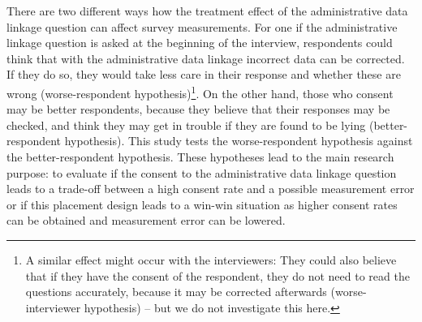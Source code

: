 There are two different ways how the treatment effect of the administrative data linkage question can affect survey measurements. For one if the administrative linkage question is asked at the beginning of the interview, respondents could think that with the administrative data linkage incorrect data can be corrected. If they do so, they would take less care in their response and whether these are wrong (worse-respondent hypothesis)\footnote{A similar effect might occur with the interviewers: They could also believe that if they have the consent of the respondent, they do not need to read the questions accurately, because it may be corrected afterwards (worse-interviewer hypothesis) -- but we do not investigate this here.}. On the other hand, those who consent may be better respondents, because they believe that their responses may be checked, and think they may get in trouble if they are found to be lying (better-respondent hypothesis). This study tests the worse-respondent hypothesis against the better-respondent hypothesis. These hypotheses lead to the main research purpose: to evaluate if the consent to the administrative data linkage question leads to a trade-off between a high consent rate and a possible measurement error or if this placement design leads to a win-win situation as higher consent rates can be obtained and measurement error can be lowered.




